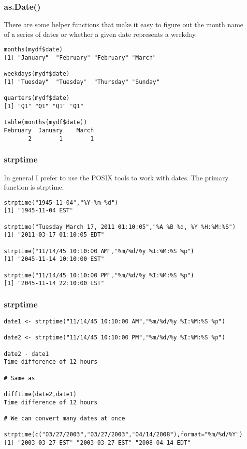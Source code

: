 \documentclass{beamer}
\begin{document}
\begin{frame}[fragile]
\frametitle{as.Date()}
There are some helper functions that make it easy to figure out the month name of a series of dates or whether a given date represents a weekday.  
\footnotesize
\begin{verbatim}
months(mydf$date)
[1] "January"  "February" "February" "March"   

weekdays(mydf$date)
[1] "Tuesday"  "Tuesday"  "Thursday" "Sunday"  

quarters(mydf$date)
[1] "Q1" "Q1" "Q1" "Q1"

table(months(mydf$date))
February  January    March 
       2        1        1 
\end{verbatim}
\end{frame}



\begin{frame}[fragile]
\frametitle{strptime}
In general I prefer to use the POSIX tools to work with dates. The primary function is strptime.
\footnotesize
\begin{verbatim}
strptime("1945-11-04","%Y-%m-%d")
[1] "1945-11-04 EST"
 
strptime("Tuesday March 17, 2011 01:10:05","%A %B %d, %Y %H:%M:%S")
[1] "2011-03-17 01:10:05 EDT"

strptime("11/14/45 10:10:00 AM","%m/%d/%y %I:%M:%S %p")
[1] "2045-11-14 10:10:00 EST"

strptime("11/14/45 10:10:00 PM","%m/%d/%y %I:%M:%S %p")
[1] "2045-11-14 22:10:00 EST"

\end{verbatim}
\end{frame}

\begin{frame}[fragile]
\frametitle{strptime}
\footnotesize
\begin{verbatim}
date1 <- strptime("11/14/45 10:10:00 AM","%m/%d/%y %I:%M:%S %p")

date2 <- strptime("11/14/45 10:10:00 PM","%m/%d/%y %I:%M:%S %p")

date2 - date1
Time difference of 12 hours

# Same as 

difftime(date2,date1)
Time difference of 12 hours

# We can convert many dates at once 

strptime(c("03/27/2003","03/27/2003","04/14/2008"),format="%m/%d/%Y")
[1] "2003-03-27 EST" "2003-03-27 EST" "2008-04-14 EDT"
\end{verbatim}
\end{frame}
\end{document}
